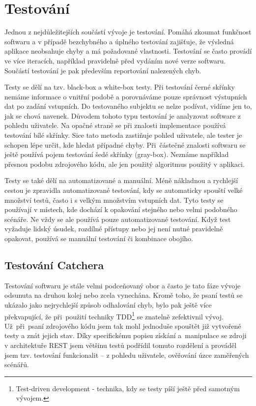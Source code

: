 \chapter{Testování}


Jednou z nejdůležitejších součástí vývoje je testování. Pomáhá zkoumat funkčnost softwaru a v případě bezchybného
a úplného testování zajišťuje, že výsledná aplikace neobsahuje chyby a má požadované vlastnosti.
Testování se často provádí ve více iteracích, například pravidelně před vydáním nové verze softwaru.
Součástí testování je pak především reportování nalezených chyb.

Testy se dělí na tzv. black-box a white-box testy. Při testování černé skřínky nemáme informace o vnitřní podobě a porovnáváme
pouze správnost výstupních dat po zadání vstupních. Do testovaného subjektu se nelze podívat, vidíme jen to, jak se chová navenek.
Důvodem tohoto typu testování je analyzovat software z pohledu uživatele.
Na opačné straně se při znalosti implementace používá testování bílé skřínky. Sice tato metoda zastiňuje pohled uživatele,
ale tester je schopen lépe určit, kde hledat případné chyby. Při~částečné znalosti softwaru se ještě používá pojem testování šedé skřínky (gray-box).
Neznáme například přesnou podobu zdrojového kódu, ale jen použitý algoritmus použitý v aplikaci. 

Testy se také dělí na automatizované a manuální. Méně nákladnou a rychlejší cestou je zpravidla automatizované testování,
kdy se automaticky spouští velké množství testů, často i s velkým množstvím vstupních dat. Tyto testy se používají v místech,
kde dochází k opakování stejného nebo velmi podobného scénáře. Ne vždy se ale používá pouze automatizované testování.
Když test vyžaduje lidský úsudek, rozdílné přístupy nebo jej není nutné pravidelně opakovat, používá se manuální testování či kombinace obojího.

\section{Testování Catchera}

Testování softwaru je stále velmi podceňovaný obor a často je tato fáze vývoje odsunuta na druhou kolej nebo zcela vynechána.
Kromě toho, že psaní testů se ukázalo jako nejrychlejší způsob odhalování chyb, bylo pak ještě více překvapující, že při~použití
techniky TDD\footnote{Test-driven development - technika, kdy se testy píší ještě před samotným vývojem.} se znatelně zefektivnil
vývoj. Už~při~psaní zdrojového kódu jsem tak mohl jednoduše spouštět již vytvořené testy a znát jejich stav.
Díky specifickému popisu získání a~manipulace se zdroji v architektuře REST jsem většinu testů podřídil tomuto rozdělení a prováděl
jsem tzv. testování funkcionalit -- z pohledu uživatele, ověřování úzce zaměřených scénářů.

